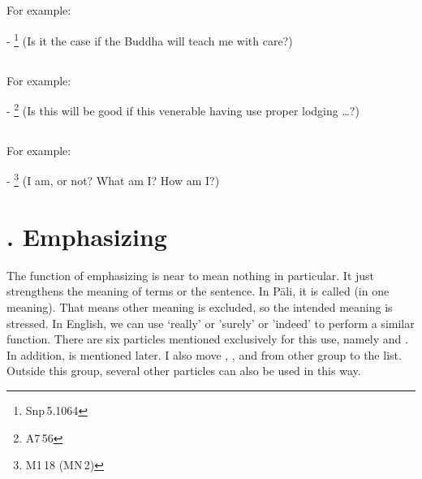 \subsection*{}\label{nip:appeva}
For example:\par
- \footnote{Snp\,5.1064} (Is it the case if the Buddha will teach me with care?) \par

\subsection*{}\label{nip:appevanaama}
For example:\par
- \footnote{A7\,56} (Is this will be good if this venerable having use proper lodging \ldots?) \par

\subsection*{}\label{nip:nukho}
For example:\par
- \footnote{M1\,18 (MN\,2)} (I am, or not? What am I? How am I?) \par

\label{nipgrp7}
\section*{. Emphasizing}

The function of emphasizing is near to mean nothing in particular. It just strengthens the meaning of terms or the sentence. In P\=ali, it is called  (in one meaning). That means other meaning is excluded, so the intended meaning is stressed. In English, we can use `really' or 'surely' or 'indeed' to perform a similar function. There are six particles mentioned exclusively for this use, namely  and . In addition,  is mentioned later. I also move , , and  from other group to the list. Outside this group, several other particles can also be used in this way.


